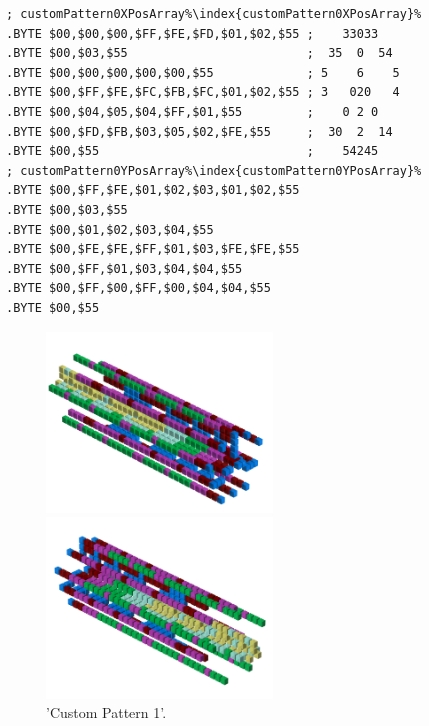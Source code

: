 \begin{minipage}[b]{0.48\linewidth}
\begin{lrbox}{\mybox}%
\begin{lstlisting}[basicstyle=\ttfamily\tiny,escapechar=\%]
; customPattern0XPosArray%\index{customPattern0XPosArray}%  
.BYTE $00,$00,$00,$FF,$FE,$FD,$01,$02,$55 ;    33033   
.BYTE $00,$03,$55                         ;  35  0  54 
.BYTE $00,$00,$00,$00,$00,$55             ; 5    6    5
.BYTE $00,$FF,$FE,$FC,$FB,$FC,$01,$02,$55 ; 3   020   4
.BYTE $00,$04,$05,$04,$FF,$01,$55         ;    0 2 0   
.BYTE $00,$FD,$FB,$03,$05,$02,$FE,$55     ;  30  2  14 
.BYTE $00,$55                             ;    54245   
; customPattern0YPosArray%\index{customPattern0YPosArray}%
.BYTE $00,$FF,$FE,$01,$02,$03,$01,$02,$55
.BYTE $00,$03,$55
.BYTE $00,$01,$02,$03,$04,$55
.BYTE $00,$FE,$FE,$FF,$01,$03,$FE,$FE,$55
.BYTE $00,$FF,$01,$03,$04,$04,$55
.BYTE $00,$FF,$00,$FF,$00,$04,$04,$55
.BYTE $00,$55
\end{lstlisting}
\end{lrbox}%
\scalebox{0.8}{\usebox{\mybox}}

\end{minipage}
\begin{minipage}[b]{0.50\linewidth}
\begin{figure}[H]
    \centering
    \begin{adjustbox}{width=6cm,margin=0cm 0cm}
      \includegraphics[width=6cm]{src/patterns/pattern9-45.png}%
    \end{adjustbox}
    \begin{adjustbox}{width=6cm,margin=0cm -1.8cm}
      \includegraphics[width=6cm]{src/patterns/pattern9-225.png}%
    \end{adjustbox}
\caption{'Custom Pattern 1'.}
\end{figure}
\end{minipage}
